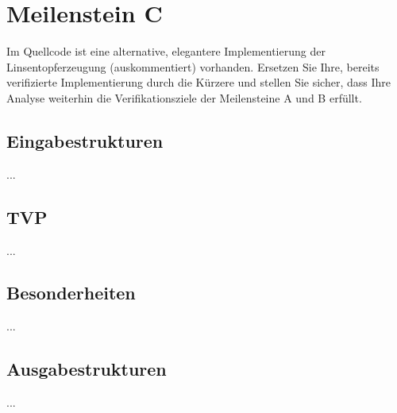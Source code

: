 \section{Meilenstein C}
Im Quellcode ist eine alternative, elegantere Implementierung der Linsentopferzeugung (auskommentiert) vorhanden. Ersetzen Sie Ihre, bereits verifizierte Implementierung durch die Kürzere und stellen Sie sicher, dass Ihre Analyse weiterhin die Verifikationsziele der Meilensteine A und B erfüllt.


\subsection{Eingabestrukturen}
...


\subsection{TVP}
...


\subsection{Besonderheiten}
...


\subsection{Ausgabestrukturen}
...